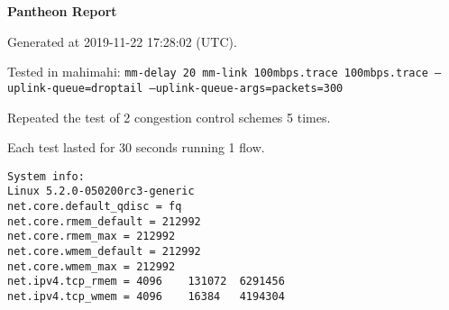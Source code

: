 \documentclass{article}
\begin{document}
\centerline{\textbf{\large{Pantheon Report}}}
\vspace{20pt}

Generated at 2019-11-22 17:28:02 (UTC).

Tested in mahimahi: \texttt{mm-delay 20 mm-link 100mbps.trace 100mbps.trace --uplink-queue=droptail --uplink-queue-args=packets=300}

Repeated the test of 2 congestion control schemes 5 times.

Each test lasted for 30 seconds running 1 flow.

\begin{verbatim}
System info:
Linux 5.2.0-050200rc3-generic
net.core.default_qdisc = fq
net.core.rmem_default = 212992
net.core.rmem_max = 212992
net.core.wmem_default = 212992
net.core.wmem_max = 212992
net.ipv4.tcp_rmem = 4096	131072	6291456
net.ipv4.tcp_wmem = 4096	16384	4194304
\end{verbatim}
\end{document}
